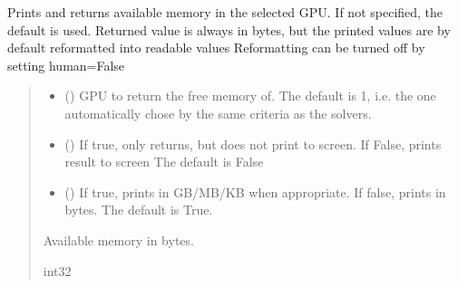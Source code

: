 \documentclass[letterpaper,10pt,english]{sphinxmanual}
\begin{document}
\begin{fulllineitems}
\label{\detokenize{_autosummary/nirfasterff.utils.cudaMemFree:nirfasterff.utils.cudaMemFree}}
\pysigstartsignatures
\pysiglinewithargsret
{}
{\sphinxparamcomma {}\sphinxparamcomma {}}
{}
\pysigstopsignatures
\sphinxAtStartPar
Prints and returns available memory in the selected GPU. If not specified, the default is used.
Returned value is always in bytes, but the printed values are by default reformatted into readable values
Reformatting can be turned off by setting human=False
\begin{quote}\begin{description}
\begin{itemize}
\item {} 
\sphinxAtStartPar
{} (\sphinxstyleliteralemphasis{\sphinxupquote{, }}) \textendash{} GPU to return the free memory of.
The default is \sphinxhyphen{}1, i.e. the one automatically chose by the same criteria as the solvers.

\item {} 
\sphinxAtStartPar
{} (\sphinxstyleliteralemphasis{\sphinxupquote{, }}) \textendash{} If true, only returns, but does not print to screen. If False, prints result to screen
The default is False

\item {} 
\sphinxAtStartPar
{} (\sphinxstyleliteralemphasis{\sphinxupquote{, }}) \textendash{} If true, prints in GB/MB/KB when appropriate. If false, prints in bytes.
The default is True.

\end{itemize}

\sphinxAtStartPar
Available memory in bytes.

\sphinxAtStartPar
int32

\end{description}\end{quote}

\end{fulllineitems}
\end{document}
